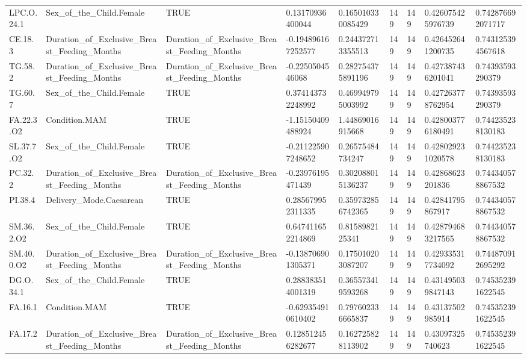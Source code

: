 \begin{longtable}{lllllllll}
LPC.O.24.1 & Sex\_of\_the\_Child.Female & TRUE & 0.13170936400044 & 0.165010330085429 & 149 & 149 & 0.426075425976739 & 0.742876692071717 \\
CE.18.3 & Duration\_of\_Exclusive\_Breast\_Feeding\_Months & Duration\_of\_Exclusive\_Breast\_Feeding\_Months & -0.194896167252577 & 0.244372713355513 & 149 & 149 & 0.426452641200735 & 0.743125394567618 \\
TG.58.2 & Duration\_of\_Exclusive\_Breast\_Feeding\_Months & Duration\_of\_Exclusive\_Breast\_Feeding\_Months & -0.2250504546068 & 0.282754375891196 & 149 & 149 & 0.427387436201041 & 0.74393593290379 \\
TG.60.7 & Sex\_of\_the\_Child.Female & TRUE & 0.374143732248992 & 0.469949795003992 & 149 & 149 & 0.427263778762954 & 0.74393593290379 \\
FA.22.3.O2 & Condition.MAM & TRUE & -1.15150409488924 & 1.44869016915668 & 149 & 149 & 0.428003776180491 & 0.744235238130183 \\
SL.37.7.O2 & Sex\_of\_the\_Child.Female & TRUE & -0.211225907248652 & 0.26575484734247 & 149 & 149 & 0.428029231020578 & 0.744235238130183 \\
PC.32.2 & Duration\_of\_Exclusive\_Breast\_Feeding\_Months & Duration\_of\_Exclusive\_Breast\_Feeding\_Months & -0.23976195471439 & 0.302088015136237 & 149 & 149 & 0.42868623201836 & 0.744340578867532 \\
PI.38.4 & Delivery\_Mode.Caesarean & TRUE & 0.285679952311335 & 0.359732856742365 & 149 & 149 & 0.42841795867917 & 0.744340578867532 \\
SM.36.2.O2 & Sex\_of\_the\_Child.Female & TRUE & 0.647411652214869 & 0.8158982125341 & 149 & 149 & 0.428794683217565 & 0.744340578867532 \\
SM.40.0.O2 & Duration\_of\_Exclusive\_Breast\_Feeding\_Months & Duration\_of\_Exclusive\_Breast\_Feeding\_Months & -0.138706901305371 & 0.175010203087207 & 149 & 149 & 0.429335317734092 & 0.744870912695292 \\
DG.O.34.1 & Sex\_of\_the\_Child.Female & TRUE & 0.288383514001319 & 0.365573419593268 & 149 & 149 & 0.431495039847143 & 0.745352391622545 \\
FA.16.1 & Condition.MAM & TRUE & -0.629354910610402 & 0.797602336665837 & 149 & 149 & 0.43137502985914 & 0.745352391622545 \\
FA.17.2 & Duration\_of\_Exclusive\_Breast\_Feeding\_Months & Duration\_of\_Exclusive\_Breast\_Feeding\_Months & 0.128512456282677 & 0.162725828113902 & 149 & 149 & 0.43097325740623 & 0.745352391622545 \\

\end{longtable}
